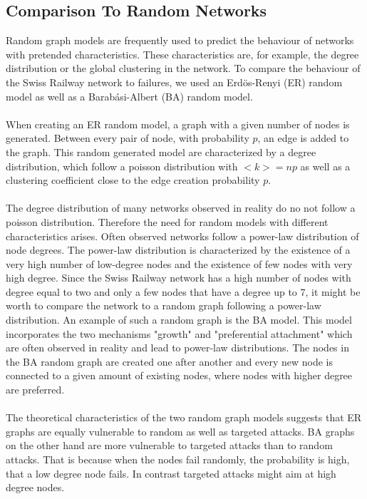 \documentclass{Resources/netsci-project}
\begin{document}
\subsection{Comparison To Random Networks}
Random graph models are frequently used to predict the behaviour of networks with pretended characteristics. These characteristics are, for example, the degree distribution or the global clustering in the network. To compare the behaviour of the Swiss Railway network to failures, we used an Erdös-Renyi (ER) random model as well as a Barabási-Albert (BA) random model.
\\~\\
When creating an ER random model, a graph with a given number of nodes is generated. Between every pair of node, with probability $ p $, an edge is added to the graph. This random generated model are characterized by a degree distribution, which follow a poisson distribution with $ <k> = np $ as well as a clustering coefficient close to the edge creation probability $ p $.
\\~\\
The degree distribution of many networks observed in reality do no not follow a poisson distribution. Therefore the need for random models with different characteristics arises. Often observed networks follow a power-law distribution of node degrees. The power-law distribution is characterized by the existence of a very high number of low-degree nodes and the existence of few nodes with very high degree. Since the Swiss Railway network has a high number of nodes with degree equal to two and only a few nodes that have a degree up to 7, it might be worth to compare the network to a random graph following a power-law distribution. An example of such a random graph is the BA model. This model incorporates the two mechanisms "growth" and "preferential attachment" which are often observed in reality and lead to power-law distributions. The nodes in the BA random graph are created one after another and every new node is connected to a given amount of existing nodes, where nodes with higher degree are preferred.
\\~\\
The theoretical characteristics of the two random graph models suggests that ER graphs are equally vulnerable to random as well as targeted attacks. BA graphs on the other hand are more vulnerable to targeted attacks than to random attacks. That is because when the nodes fail randomly, the probability is high, that a low degree node fails. In contrast targeted attacks might aim at high degree nodes.
\end{document}
